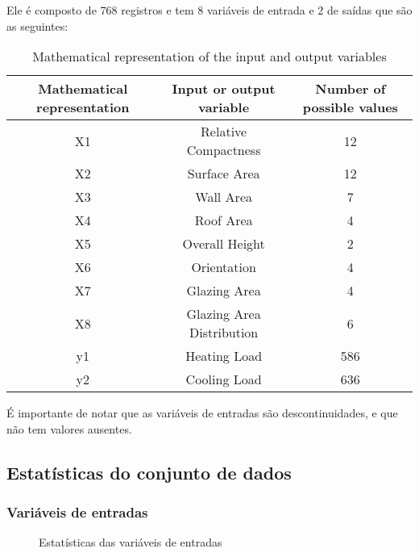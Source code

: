 \documentclass[paper=a4, fontsize=11pt]{article} %
\numberwithin{equation}{section} %
\numberwithin{figure}{section} %
\numberwithin{table}{section} %
\begin{document}
\medskip
Ele é composto de 768 registros e tem 8 variáveis de entrada e 2 de saídas que são as seguintes:

\begin{table}[H]
\caption{Mathematical representation of the input and output variables}
\medskip
\renewcommand\arraystretch{1.3}
\renewcommand\tabcolsep{0pt}
  \begin{tabular*}{1\linewidth}{@{\extracolsep{\fill}}ccc}
    \hline
    Mathematical representation & Input or output variable & Number of possible values \\
    \hline
    X1 & Relative Compactness & 12 \\
    X2 & Surface Area & 12 \\
    X3 & Wall Area & 7 \\
    X4 & Roof Area & 4 \\
    X5 & Overall Height & 2 \\
    X6 & Orientation & 4 \\
    X7 & Glazing Area & 4 \\
    X8 & Glazing Area Distribution & 6 \\
    y1 & Heating Load & 586 \\
    y2 & Cooling Load & 636 \\
  \end{tabular*}\par\medskip
\label{tab:priors}
\end{table}

É importante de notar que as variáveis de entradas são descontinuidades, e que não tem valores ausentes.


\subsection{Estatísticas do conjunto de dados}

\subsubsection{Variáveis de entradas}

  \begin{figure}[H] %
  \begin{center}
  \end{center}
  \caption{Estatísticas das variáveis de entradas}
  \label{statis_X}
  \end{figure}
\end{document}
